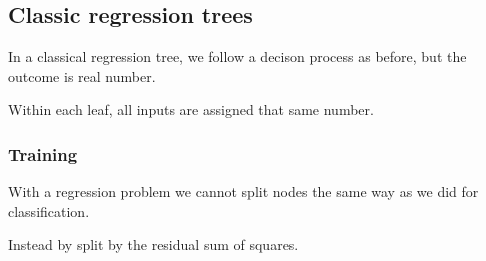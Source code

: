 
\subsection{Classic regression trees}

In a classical regression tree, we follow a decison process as before, but the outcome is real number.

Within each leaf, all inputs are assigned that same number.

\subsubsection{Training}

With a regression problem we cannot split nodes the same way as we did for classification.

Instead by split by the residual sum of squares.

